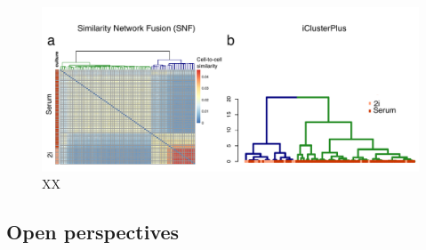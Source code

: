 \begin{figure}[H]
	\centering 	
	\includegraphics[width=1.0\textwidth]{MOFA_scMT_clustering}
	\caption{XX}
	\label{fig:MOFA_scMT_clustering}
\end{figure}



\subsection{Open perspectives}


